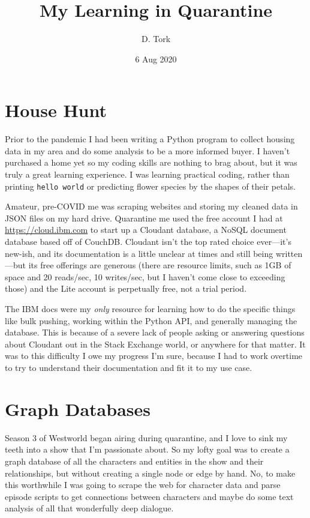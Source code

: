 \documentclass[letterpaper,11pt,onecolumn]{article}
\author{D. Tork}
\title{My Learning in Quarantine}
\date{6 Aug 2020}
\begin{document}
\maketitle
\tableofcontents

\section{House Hunt}
Prior to the pandemic I had been writing a Python program to collect housing data in my area and
do some analysis to be a more informed buyer. I haven't purchased a home yet so my coding skills
are nothing to brag about, but it was truly a great learning experience. I was learning practical
coding, rather than printing \verb|hello world| or predicting flower species by the shapes of their
petals.

Amateur, pre-COVID me was scraping websites and storing my cleaned data in JSON files on my hard
drive. Quarantine me used the free account I had at \url{https://cloud.ibm.com} to start up a 
Cloudant database, a NoSQL document database based off of CouchDB. Cloudant isn't the top rated 
choice ever---it's new-ish, and its documentation is a little unclear at times and still being 
written---but its free offerings are generous (there are resource limits, such as 1GB of space and
20 reads/sec, 10 writes/sec, but I haven't come close to exceeding those) and the Lite account is 
perpetually free, not a trial period. 

The IBM docs were my \emph{only} resource for learning how to do the specific things like bulk
pushing, working within the Python API, and generally managing the database. This is because of a
severe lack of people asking or answering questions about Cloudant out in the Stack Exchange world,
or anywhere for that matter. It was to this difficulty I owe my progress I'm sure, because I had to
work overtime to try to understand their documentation and fit it to my use case. 


\section{Graph Databases}
Season 3 of Westworld began airing during quarantine, and I love to sink my teeth into a show that
I'm passionate about. So my lofty goal was to create a graph database of all the characters and 
entities in the show and their relationships, but without creating a single node or edge by hand. 
No, to make this worthwhile I was going to scrape the web for character data and parse episode
scripts to get connections between characters and maybe do some text analysis of all that
wonderfully deep dialogue.
\end{document}
